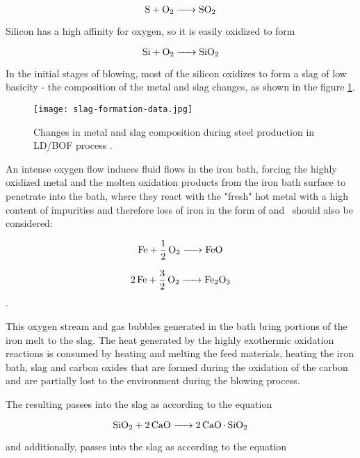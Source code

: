 \begin{equation}
\ce{S + O2 -> SO2}
\end{equation}

Silicon has a high affinity for oxygen, so it is easily oxidized to form 

\begin{equation}
\ce{Si + O2 -> SiO2}
\end{equation}

In the initial stages of blowing, most of the silicon oxidizes to form a slag of low basicity - the composition of the metal and slag changes, as shown in the figure \ref{o:20}.

\begin{figure}[h!]
	\centering
	\texttt{[image: slag-formation-data.jpg]}
	\caption{Changes in metal and slag composition during steel production in LD/BOF process \citep{Turkdogan1996}.}
	\label{o:20}
\end{figure}

An intense oxygen flow induces fluid flows in the iron bath, forcing the highly oxidized metal and the molten oxidation products from the iron bath surface to penetrate into the bath, where they react with the "fresh" hot metal with a high content of impurities and therefore loss of iron in the form of  and~ should also be considered:

\begin{equation}
\ce{Fe + 1/2O2 -> FeO}
\end{equation}

\begin{equation}
\ce{2Fe + 3/2O2 -> Fe2O3}
\end{equation}.

This oxygen stream and gas bubbles generated in the bath bring portions of the iron melt to the slag. The heat generated by the highly exothermic oxidation reactions is consumed by heating and melting the feed materials, heating the iron bath, slag and carbon oxides that are formed during the oxidation of the carbon and are partially lost to the environment during the blowing process.

The resulting  passes into the slag as  according to the equation

\begin{equation}
\ce{SiO2 + 2CaO -> 2CaO.SiO2}
\end{equation}

and additionally,  passes into the slag as  according to the equation \cite{sprava2017}

